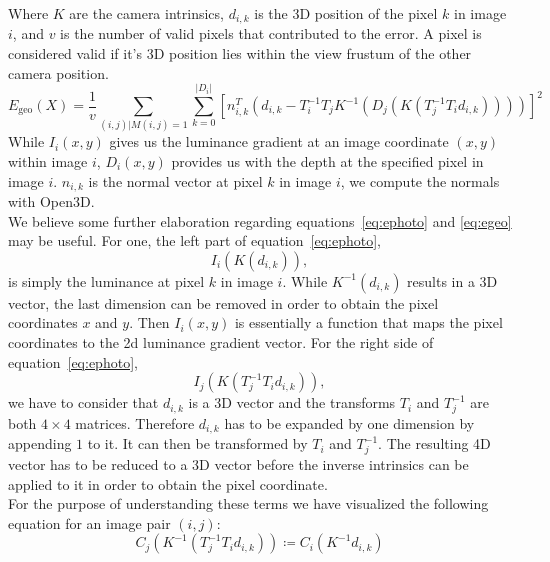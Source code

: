         Where $K$ are the camera intrinsics, $d_{i,k}$ is the 3D position of the pixel $k$ in image $i$, and $v$ is the number of valid pixels that contributed to the error.
        A pixel is considered valid if it's 3D position lies within the view frustum of the other camera position.
        \begin{equation}
            E_{\text{geo}}(X) =
            \frac{1}{v} \sum_{(i,j) | M(i,j)=1}\sum_{k=0}^{\left\lvert D_i \right\rvert}
            \left[
            n_{i,k}^T \left(d_{i,k} - T_i^{-1}T_jK^{-1} \left( D_j \left( K\left( T_j^{-1}T_id_{i,k} \right) \right) \right)\right)
            \right]^2
            \label{eq:egeo}
        \end{equation}
        While $I_i(x,y)$ gives us the luminance gradient at an image coordinate $(x,y)$ within image $i$, $D_i(x,y)$ provides us with the depth at the specified pixel in image $i$.
        $n_{i,k}$ is the normal vector at pixel $k$ in image $i$, we compute the normals with Open3D.\\
        We believe some further elaboration regarding equations~\ref{eq:ephoto} and \ref{eq:egeo} may be useful.
        For one, the left part of equation~\ref{eq:ephoto},
        \begin{equation*}
            I_i(K(d_{i,k})),
        \end{equation*}
        is simply the luminance at pixel $k$ in image $i$.
        While $K^{-1}(d_{i,k})$ results in a 3D vector, the last dimension can be removed in order to obtain the pixel coordinates $x$ and $y$.
        Then $I_i(x,y)$ is essentially a function that maps the pixel coordinates to the 2d luminance gradient vector.
        For the right side of equation~\ref{eq:ephoto},
        \begin{equation*}
            I_j(K(T_j^{-1}T_id_{i,k})),
        \end{equation*}
        we have to consider that $d_{i,k}$ is a 3D vector and the transforms $T_i$ and $T_j^{-1}$ are both $4 \times 4$ matrices.
        Therefore $d_{i,k}$ has to be expanded by one dimension by appending $1$ to it.
        It can then be transformed by $T_i$ and $T_j^{-1}$.
        The resulting 4D vector has to be reduced to a 3D vector before the inverse intrinsics can be applied to it in order to obtain the pixel coordinate.\\
        For the purpose of understanding these terms we have visualized the following equation for an image pair $(i, j)$:
        \begin{equation}
            C_j(K^{-1}(T_j^{-1}T_id_{i,k})) \coloneqq C_i(K^{-1}d_{i,k})
            \label{eq:vis_perspective}
        \end{equation}
